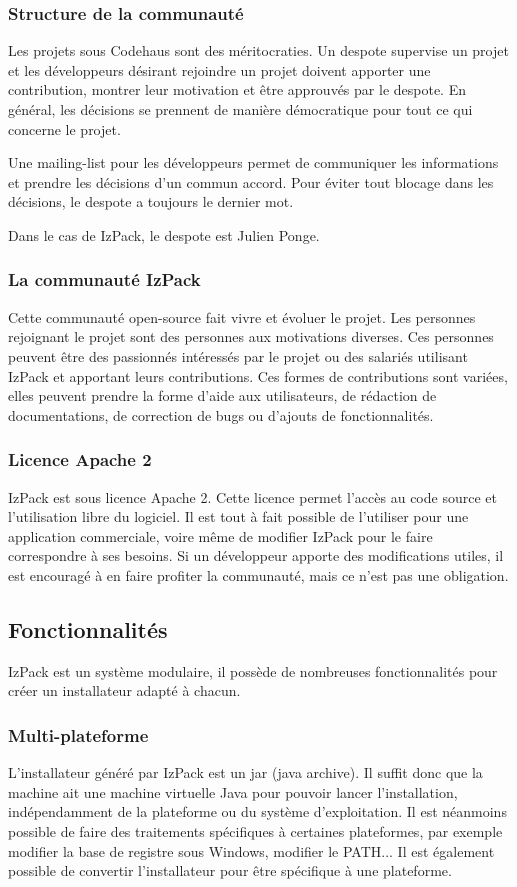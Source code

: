 \subsubsection{Structure de la communauté}
Les projets sous Codehaus sont des méritocraties.
Un despote supervise un projet et les développeurs désirant rejoindre un projet doivent apporter une contribution, montrer leur motivation et être approuvés par le despote.
En général, les décisions se prennent de manière démocratique pour tout ce qui concerne le projet.

Une mailing-list pour les développeurs permet de communiquer les informations et prendre les décisions d'un commun accord.
Pour éviter tout blocage dans les décisions, le despote a toujours le dernier mot.

Dans le cas de IzPack, le despote est Julien Ponge.

\subsubsection{La communauté IzPack}
Cette communauté open-source fait vivre et évoluer le projet.
Les personnes rejoignant le projet sont des personnes aux motivations diverses.
Ces personnes peuvent être des passionnés intéressés par le projet ou des salariés utilisant IzPack et apportant leurs contributions.
Ces formes de contributions sont variées, elles peuvent prendre la forme d'aide aux utilisateurs, de rédaction de documentations, de correction de bugs ou d'ajouts de fonctionnalités.

\subsubsection{Licence Apache 2}
IzPack est sous licence Apache 2. Cette licence permet l'accès au code source et l'utilisation libre du logiciel.
Il est tout à fait possible de l'utiliser pour une application commerciale, voire même de modifier IzPack pour le faire correspondre à ses besoins. Si un développeur apporte des modifications utiles, il est encouragé à en faire profiter la communauté, mais ce n'est pas une obligation.

\subsection{Fonctionnalités}
IzPack est un système modulaire, il possède de nombreuses fonctionnalités pour créer un installateur adapté à chacun.

\subsubsection{Multi-plateforme}
L'installateur généré par IzPack est un jar (java archive).
Il suffit donc que la machine ait une machine virtuelle Java pour pouvoir lancer l'installation, indépendamment de la plateforme ou du système d'exploitation.
Il est néanmoins possible de faire des traitements spécifiques à certaines plateformes, par exemple modifier la base de registre sous Windows, modifier le PATH...
Il est également possible de convertir l'installateur pour être spécifique à une plateforme.

